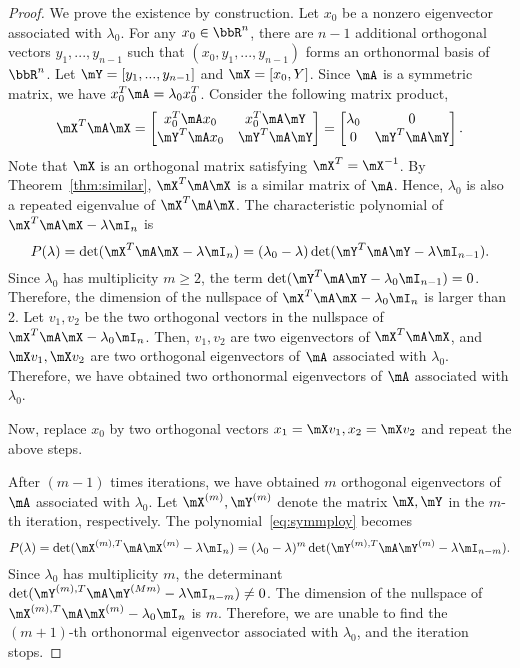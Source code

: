 \documentclass[11pt]{article}
\theoremstyle{plain}
\theoremstyle{definition}
\begin{document}
\begin{proof}
	We prove the existence by construction. Let $x_0$ be a nonzero eigenvector associated with $\lambda_0$. For any $x_0 \in \bbR^{n}$, there are $n-1$ additional orthogonal vectors $y_1,...,y_{n-1}$ such that $(x_0, y_1,...,y_{n-1})$ forms an orthonormal basis of $\bbR^n$. Let $\mY = [y_1,...,y_{n-1}]$ and $\mX = [x_0,Y]$. Since $\mA$ is a symmetric matrix, we have $x_0^T \mA = \lambda_0 x_0^T $. Consider the following matrix product,
	\begin{align}\label{eq:symmrepeat}
		\mX^T \mA \mX =  \begin{bmatrix}
			x_0^T \mA x_0 & x_0^T \mA \mY\\
			\mY^T \mA x_0 & \mY^T \mA \mY 
		\end{bmatrix} =  \begin{bmatrix}
			\lambda_0 & 0\\
			0 & \mY^T \mA \mY 
		\end{bmatrix} .
	\end{align}
	Note that $\mX$ is an orthogonal matrix satisfying $\mX^T = \mX^{-1}$. By Theorem~\ref{thm:similar}, $\mX^T \mA \mX$ is a similar matrix of $\mA$. Hence, $\lambda_0$ is also a repeated eigenvalue of $\mX^T \mA \mX$. The characteristic  polynomial of $\mX^T \mA \mX - \lambda \mI_n$ is 
	\begin{equation}\label{eq:symmploy}
		P(\lambda) = \det(\mX^T \mA \mX - \lambda \mI_n) = (\lambda_0 - \lambda) \det(\mY^T \mA \mY - \lambda \mI_{n-1}). 
	\end{equation}
	Since $\lambda_0$ has multiplicity $m \geq 2$, the term $\det(\mY^T \mA \mY - \lambda_0 \mI_{n-1}) = 0$. Therefore, the dimension of the nullspace of $\mX^T \mA \mX - \lambda_0 \mI_n$ is larger than 2. Let $v_1,v_2$ be the two orthogonal vectors in the nullspace of $\mX^T \mA \mX - \lambda_0 \mI_n$. Then, $v_1, v_2$ are two eigenvectors of $\mX^T \mA \mX$, and $\mX v_1, \mX v_2$ are two orthogonal eigenvectors of $\mA$ associated with $\lambda_0$. Therefore, we have obtained two orthonormal  eigenvectors of $\mA$ associated with $\lambda_0$.
	
	Now, replace $x_0$ by two orthogonal vectors $x_1 = \mX v_1, x_2 = \mX v_2$ and repeat the above steps.
	
	After $(m-1)$ times iterations, we have obtained $m$ orthogonal eigenvectors of $\mA$ associated with $\lambda_0$. Let $\mX^{(m)}, \mY^{(m)}$ denote the matrix $\mX, \mY$ in the $m$-th iteration, respectively. The polynomial~\eqref{eq:symmploy} becomes
	\[ P(\lambda) = \det(\mX^{(m),T} \mA \mX^{(m)} - \lambda \mI_n) = (\lambda_0 - \lambda)^m \det(\mY^{(m),T} \mA \mY^{(m)} - \lambda \mI_{n-m}). \]
	Since $\lambda_0$ has multiplicity $m$, the determinant $\det(\mY^{(m),T} \mA \mY^{(Mm)} - \lambda \mI_{n-m}) \neq 0$. The dimension of the nullspace of $\mX^{(m),T} \mA \mX^{(m)} - \lambda_0 \mI_n$ is $m$. Therefore, we are unable to find the $(m+1)$-th orthonormal eigenvector associated with $\lambda_0$, and the iteration stops. 
\end{proof}
\end{document}
